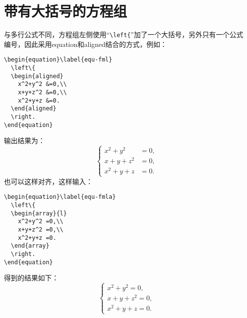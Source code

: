 \section{带有大括号的方程组}\label{section4-7}
与多行公式不同，方程组左侧使用“\verb|\left{|”加了一个大括号，另外只有一个公式编号，因此采用equation和aligned结合的方式，例如：
\begin{verbatim}
\begin{equation}\label{equ-fml}
  \left\{
  \begin{aligned}
    x^2+y^2 &=0,\\
    x+y+z^2 &=0,\\
    x^2+y+z &=0.
  \end{aligned}
  \right.
\end{equation}
\end{verbatim}
输出结果为：
\begin{equation}\label{equ-fml}
  \left\{
  \begin{aligned}
    x^2+y^2 &=0,\\
    x+y+z^2 &=0,\\
    x^2+y+z &=0.
  \end{aligned}
  \right.
\end{equation}
也可以这样对齐，这样输入：
\begin{verbatim}
\begin{equation}\label{equ-fmla}
  \left\{
  \begin{array}{l}
    x^2+y^2 =0,\\
    x+y+z^2 =0,\\
    x^2+y+z =0.
  \end{array}
  \right.
\end{equation}
\end{verbatim}
得到的结果如下：
\begin{equation}\label{equ-fmla}
  \left\{
  \begin{array}{l}
    x^2+y^2 =0,\\
    x+y+z^2 =0,\\
    x^2+y+z =0.
  \end{array}
  \right.
\end{equation}

